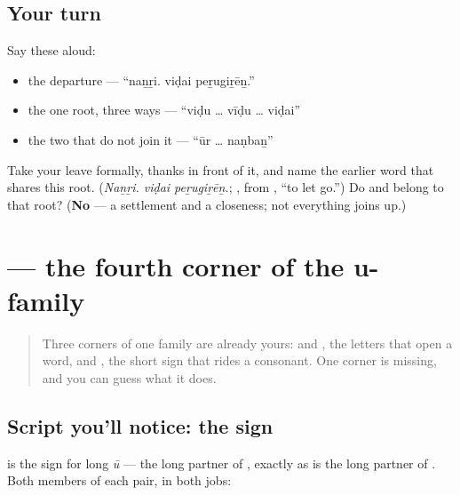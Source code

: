\subsection*{Your turn}
Say these aloud:

\begin{itemize}
\raggedright
  \item the departure — \textquotedblleft{}naṉṟi. viḍai peṟugiṟēṉ.\textquotedblright{}
  \item the one root, three ways — \textquotedblleft{}viḍu … vīḍu … viḍai\textquotedblright{}
  \item the two that do not join it — \textquotedblleft{}ūr … naṇbaṉ\textquotedblright{}
\end{itemize}

\begin{tcolorbox}[breakable,colback=teal!4,colframe=teal!35!black,title={Before you move on}]
Take your leave formally, thanks in front of it, and name the earlier word that shares this root. (\emph{Naṉṟi. viḍai peṟugiṟēṉ.}; \textbf{}, from \textbf{}, \textquotedblleft{}to let go.\textquotedblright{}) Do \textbf{} and \textbf{} belong to that root? (\textbf{No} — a settlement and a closeness; not everything joins up.)
\end{tcolorbox}
\section[\texorpdfstring{\ta{மூன்று} (mūṉṟu)}{மூன்று (mūṉṟu)}]{ — the fourth corner of the u-family}

\label{lesson:TA-W19-read-muunru}



\begin{quote}
Three corners of one family are already yours: \textbf{} and \textbf{}, the letters that open a word, and \textbf{}, the short sign that rides a consonant. One corner is missing, and you can guess what it does.
\end{quote}

\subsection*{Script you'll notice: the  sign}
\textbf{} is the sign for long \emph{ū} — the long partner of \textbf{}, exactly as \textbf{} is the long partner of \textbf{}. Both members of each pair, in both jobs:

